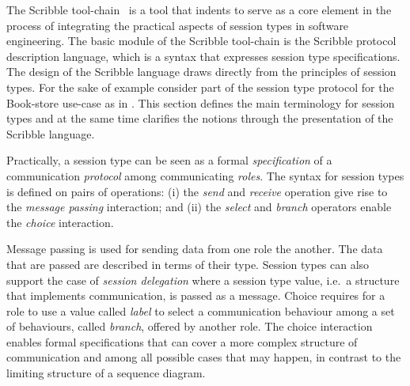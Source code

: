 The Scribble tool-chain~\cite{scribble} is a tool that indents
to serve as a core element in the process of integrating
the practical aspects of session types in software engineering.
The basic module of the Scribble
tool-chain is the Scribble protocol description language,
which is a syntax that expresses session type specifications.
The design of the Scribble language draws directly from
the principles of session types. For the sake of example
consider part of the session type protocol for the Book-store
use-case as in . 
This section defines
the main terminology for session types and at the same
time clarifies the notions through the presentation
of the Scribble language.

Practically, a session type can be seen as a formal
{\em specification} of a communication {\em protocol} among communicating {\em roles}.
The syntax for session types is defined on pairs of operations:
(i) the {\em send} and {\em receive} operation give rise to
the {\em message passing} interaction; and
(ii) the {\em select} and {\em branch} operators enable the
{\em choice} interaction.

Message passing is used for sending data from one role the another.
The data that are passed are described in terms of their type. Session
types can also support the case of {\em session delegation}
where a session type value, i.e.~a structure that implements communication,
is passed as a message.
Choice requires for a role to use a value called {\em label}
to select a communication behaviour among
a set of behaviours, called {\em branch}, offered by another role.
The choice interaction enables formal specifications that can
cover a more complex structure of communication and among all possible
cases that may happen, in contrast to the limiting structure of
a sequence diagram.

